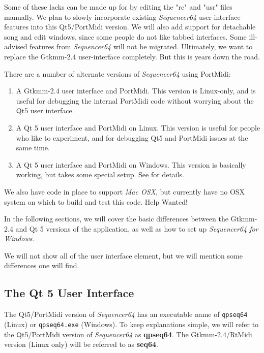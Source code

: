    Some of these lacks can be made up for by editing the "rc" and "usr" files
   manually.
   We plan to slowly incorporate existing \textsl{Sequencer64} user-interface
   features into this Qt5/PortMidi version.
   We will also add support for detachable song and edit windows, since
   some people do not like tabbed interfaces.
   Some ill-advised features from \textsl{Sequencer64} will not be migrated.
   Ultimately, we want to replace the Gtkmm-2.4 user-interface completely.
   But this is years down the road.

   There are a number of alternate versions of \textsl{Sequencer64} using
   PortMidi:

   \begin{enumerate}
      \item A Gtkmm-2.4 user interface and PortMidi.  This version is
         Linux-only, and is useful for debugging the internal PortMidi code
         without worrying about the Qt5 user interface.
      \item A Qt 5 user interface and PortMidi on Linux.  This version is
         useful for people who like to experiment, and for debugging Qt5 and
         PortMidi issues at the same time.
      \item A Qt 5 user interface and PortMidi on Windows.  This version is
         basically working, but takes some special setup.
         See  for details.
   \end{enumerate}

   We also have code in place to support
   \textsl{Mac OSX},
   but currently have no OSX system on which to build and test this
   code.  Help Wanted!

   In the following sections, we will cover the basic differences between the
   Gtkmm-2.4 and Qt 5 versions of the application, as well as how to set up
   \textsl{Sequencer64 for Windows}.

   We will not show all of the user interface element, but we will mention some
   differences one will find.

\subsection{The Qt 5 User Interface}
\label{subsec:qt_portmidi_qt5_user_interface}

   The Qt5/PortMidi version of \textsl{Sequencer64} has an executable name of
   \texttt{qpseq64} (Linux) or \texttt{qpseq64.exe} (Windows).
   To keep explanations simple, we will refer to the Qt5/PortMidi version of
   \textsl{Sequencer64} as \textbf{qpseq64}.
   The Gtkmm-2.4/RtMidi version (Linux only) will be referred to as
   \textbf{seq64}.

